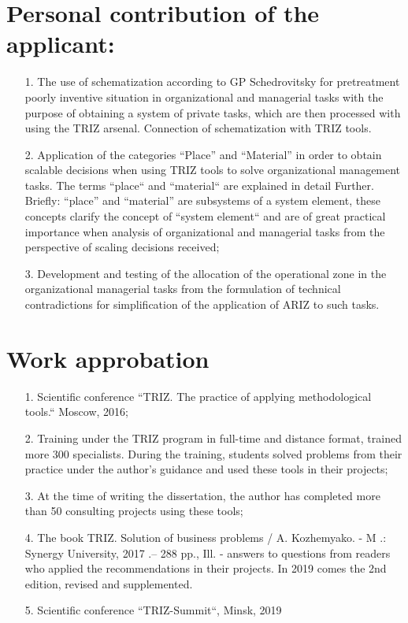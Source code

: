 \documentclass[11pt,a4paper]{book}
\begin{document}
\section{Personal contribution of the applicant:}
\begin{itemize}
\item[1.] The use of schematization according to GP Schedrovitsky for
  pretreatment poorly inventive situation in organizational and managerial
  tasks with the purpose of obtaining a system of private tasks, which are
  then processed with using the TRIZ arsenal. Connection of schematization
  with TRIZ tools.
\item[2.] Application of the categories “Place” and “Material” in order to
  obtain scalable decisions when using TRIZ tools to solve organizational
  management tasks. The terms “place“ and “material“ are explained in detail
  Further. Briefly: “place” and “material” are subsystems of a system element,
  these concepts clarify the concept of “system element“ and are of great
  practical importance when analysis of organizational and managerial tasks
  from the perspective of scaling decisions received;
\item[3.] Development and testing of the allocation of the operational zone in
  the organizational managerial tasks from the formulation of technical
  contradictions for simplification of the application of ARIZ to such tasks.
\end{itemize}
\section{Work approbation}
\begin{itemize}
\item[1.] Scientific conference “TRIZ. The practice of applying methodological
  tools.“ Moscow, 2016;
\item[2.] Training under the TRIZ program in full-time and distance format,
  trained more 300 specialists. During the training, students solved problems
  from their practice under the author’s guidance and used these tools in
  their projects;
\item[3.] At the time of writing the dissertation, the author has completed
  more than 50 consulting projects using these tools;
\item[4.] The book TRIZ. Solution of business problems / A. Kozhemyako. - M .:
  Synergy University, 2017 .-- 288 pp., Ill. - answers to questions from
  readers who applied the recommendations in their projects. In 2019 comes the
  2nd edition, revised and supplemented.
\item[5.] Scientific conference “TRIZ-Summit“, Minsk, 2019
\end{itemize}
\end{document}
